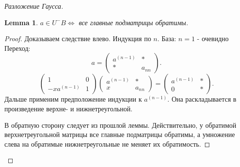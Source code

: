 \documentclass[11pt]{book}
\theoremstyle{definition}
\theoremstyle{plain}
\theoremstyle{plain}
\newtheorem*{lm}{Lemma}
\theoremstyle{definition}
\theoremstyle{remark}
\begin{document}
\begin{proof}[Разложение Гаусса]
    \begin{lm}
        $a \in  U^- B \Leftrightarrow $ все главные подматрицы обратимы.
    \end{lm}
    \begin{proof}
	Доказываем следствие влево.
        Индукция по $n$.
	База: $n=1$ - очевидно\\
	Переход: \\
	\[
	a = 
	\left ( 
	\begin{array}{cc}
	    a^{(n-1)} & * \\
	    * & a_{nn}
	\end{array}
	\right )
	.\] 
	\[
	     \left ( 
	    \begin{array}{cc}
		1&0\\-xa^{(n-1)}&1
	    \end{array}
	    \right )
	    \left ( 
	    \begin{array}{cc}
		a^{(n-1)} & *\\
		x&a_{nn}
	    \end{array}
	    \right )=
	    \left ( 
	    \begin{array}{cc}
		a^{(n-1)}&*\\0&*
	    \end{array}
	    \right )
	.\] 
	Дальше применим предположение индукции к $a^{(n-1)}$. Она раскладывается в произведение верхне- и нижнетреугольной.

	В обратную сторону следует из прошлой леммы.
	Действительно, у обратимой верхнетреугольной матрицы все главные подматрицы обратимы, а умножение слева на обратимые 	нижнетреугольные не меняет их обратимость.
    \end{proof}


\end{proof}
\end{document}
